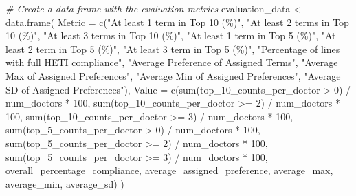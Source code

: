 \documentclass[
]{article}
\newenvironment{Shaded}{\begin{snugshade}}{\end{snugshade}}
\newcommand{\AttributeTok}[1]{\textcolor[rgb]{0.77,0.63,0.00}{#1}}
\newcommand{\CommentTok}[1]{\textcolor[rgb]{0.56,0.35,0.01}{\textit{#1}}}
\newcommand{\DecValTok}[1]{\textcolor[rgb]{0.00,0.00,0.81}{#1}}
\newcommand{\FunctionTok}[1]{\textcolor[rgb]{0.00,0.00,0.00}{#1}}
\newcommand{\NormalTok}[1]{#1}
\newcommand{\OtherTok}[1]{\textcolor[rgb]{0.56,0.35,0.01}{#1}}
\newcommand{\SpecialCharTok}[1]{\textcolor[rgb]{0.00,0.00,0.00}{#1}}
\newcommand{\StringTok}[1]{\textcolor[rgb]{0.31,0.60,0.02}{#1}}
\begin{document}
\begin{Shaded}
\begin{Highlighting}[]
\CommentTok{\# Create a data frame with the evaluation metrics}
\NormalTok{evaluation\_data }\OtherTok{\textless{}{-}} \FunctionTok{data.frame}\NormalTok{(}
  \AttributeTok{Metric =} \FunctionTok{c}\NormalTok{(}\StringTok{"At least 1 term in Top 10 (\%)"}\NormalTok{, }
             \StringTok{"At least 2 terms in Top 10 (\%)"}\NormalTok{, }
             \StringTok{"At least 3 terms in Top 10 (\%)"}\NormalTok{, }
             \StringTok{"At least 1 term in Top 5 (\%)"}\NormalTok{,}
             \StringTok{"At least 2 term in Top 5 (\%)"}\NormalTok{,}
             \StringTok{"At least 3 term in Top 5 (\%)"}\NormalTok{,}
             \StringTok{"Percentage of lines with full HETI compliance"}\NormalTok{,}
             \StringTok{"Average Preference of Assigned Terms"}\NormalTok{,}
             \StringTok{"Average Max of Assigned Preferences"}\NormalTok{,}
             \StringTok{"Average Min of Assigned Preferences"}\NormalTok{,}
             \StringTok{"Average SD of Assigned Preferences"}\NormalTok{),}
  \AttributeTok{Value =} \FunctionTok{c}\NormalTok{(}\FunctionTok{sum}\NormalTok{(top\_10\_counts\_per\_doctor }\SpecialCharTok{\textgreater{}} \DecValTok{0}\NormalTok{) }\SpecialCharTok{/}\NormalTok{ num\_doctors }\SpecialCharTok{*} \DecValTok{100}\NormalTok{, }
            \FunctionTok{sum}\NormalTok{(top\_10\_counts\_per\_doctor }\SpecialCharTok{\textgreater{}=} \DecValTok{2}\NormalTok{) }\SpecialCharTok{/}\NormalTok{ num\_doctors }\SpecialCharTok{*} \DecValTok{100}\NormalTok{, }
            \FunctionTok{sum}\NormalTok{(top\_10\_counts\_per\_doctor }\SpecialCharTok{\textgreater{}=} \DecValTok{3}\NormalTok{) }\SpecialCharTok{/}\NormalTok{ num\_doctors }\SpecialCharTok{*} \DecValTok{100}\NormalTok{, }
            \FunctionTok{sum}\NormalTok{(top\_5\_counts\_per\_doctor }\SpecialCharTok{\textgreater{}} \DecValTok{0}\NormalTok{) }\SpecialCharTok{/}\NormalTok{ num\_doctors }\SpecialCharTok{*} \DecValTok{100}\NormalTok{,}
            \FunctionTok{sum}\NormalTok{(top\_5\_counts\_per\_doctor }\SpecialCharTok{\textgreater{}=} \DecValTok{2}\NormalTok{) }\SpecialCharTok{/}\NormalTok{ num\_doctors }\SpecialCharTok{*} \DecValTok{100}\NormalTok{,}
            \FunctionTok{sum}\NormalTok{(top\_5\_counts\_per\_doctor }\SpecialCharTok{\textgreater{}=} \DecValTok{3}\NormalTok{) }\SpecialCharTok{/}\NormalTok{ num\_doctors }\SpecialCharTok{*} \DecValTok{100}\NormalTok{,}
\NormalTok{            overall\_percentage\_compliance,}
\NormalTok{            average\_assigned\_preference,}
\NormalTok{            average\_max,}
\NormalTok{            average\_min,}
\NormalTok{            average\_sd)}
\NormalTok{)}


\end{Highlighting}
\end{Shaded}
\end{document}
